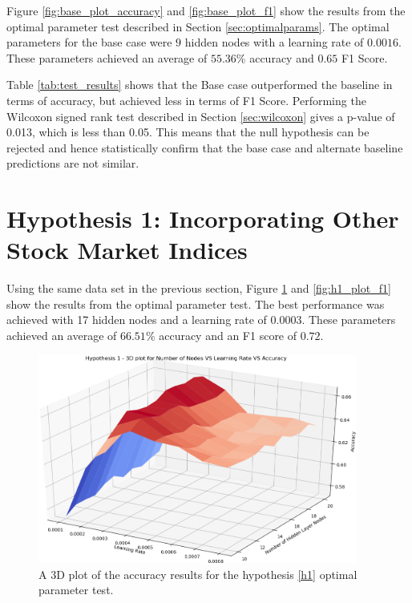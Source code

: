\documentclass{UoYCSproject}
\begin{document}
Figure \ref{fig:base_plot_accuracy} and \ref{fig:base_plot_f1} show the results from the optimal parameter test described in Section \ref{sec:optimalparams}. The optimal parameters for the base case were $9$ hidden nodes with a learning rate of $0.0016$. These parameters achieved an average of $55.36$\% accuracy and $0.65$ F1 Score.

Table \ref{tab:test_results} shows that the Base case outperformed the baseline in terms of accuracy, but achieved less in terms of F1 Score. Performing the Wilcoxon signed rank test described in Section \ref{sec:wilcoxon} gives a p-value of 0.013, which is less than 0.05. This means that the null hypothesis can be rejected and hence statistically confirm that the base case and alternate baseline predictions are not similar. 

\section{Hypothesis 1: Incorporating Other Stock Market Indices}
Using the same data set in the previous section, Figure \ref{fig:h1_plot_accuracy} and \ref{fig:h1_plot_f1} show the results from the optimal parameter test. The best performance was achieved with 17 hidden nodes and a learning rate of 0.0003. These parameters achieved an average of $66.51$\% accuracy and an F1 score of $0.72$.

\begin{figure}[h]
\includegraphics[width=10.5cm]{h1_accuracy.png}
\centering
\caption{A 3D plot of the accuracy results for the hypothesis \ref{h1} optimal parameter test.} 
\label{fig:h1_plot_accuracy}
\end{figure}
\end{document}
